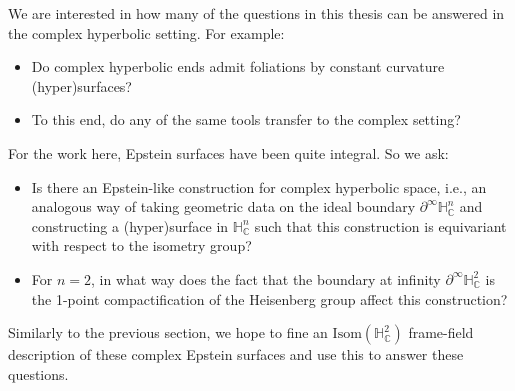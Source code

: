 \documentclass{amsart}
\newcommand{\C}{\mathbb{C}}
\renewcommand{\H}{\mathbb{H}}
\begin{document}
We are interested in how many of the questions in this thesis can be answered in the complex hyperbolic setting. For example:
\begin{itemize}
\item Do complex hyperbolic ends admit foliations by constant curvature (hyper)surfaces?
\item To this end, do any of the same tools transfer to the complex setting? 
\end{itemize}
For the work here, Epstein surfaces have been quite integral. So we ask:
\begin{itemize}
\item Is there an Epstein-like construction for complex hyperbolic space, i.e., an analogous way of taking geometric data on the ideal boundary $\partial^\infty \H_{\C}^n$ and constructing a (hyper)surface in $\H_{\C}^n$ such that this construction is equivariant with respect to the isometry group? 
\item For $n=2$, in what way does the fact that the boundary at infinity $\partial^\infty \H_{\C}^2$ is the 1-point compactification of the Heisenberg group affect this construction?
\end{itemize}
Similarly to the previous section, we hope to fine an $\mathrm{Isom}(\H_{\C}^2)$ frame-field description of these complex Epstein surfaces and use this to answer these questions. 





\end{document}
